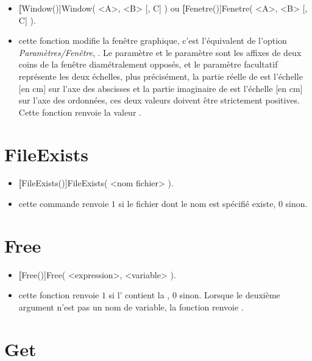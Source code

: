 \begin{itemize}
 \item \util \textbf[Window()]{Window( <A>, <B> [, C] )} ou \textbf[Fenetre()]{Fenetre( <A>, <B> [, C] )}.
 \item \desc cette fonction modifie la fenêtre graphique, c'est l'équivalent de l'option \textit{Paramètres/Fenêtre}, . Le paramètre  et le paramètre  sont les affixes de deux coins de la fenêtre diamétralement opposés, et le paramètre facultatif  représente les deux échelles, plus précisément, la partie réelle de  est l'échelle [en cm] sur l'axe des abscisses et la partie imaginaire de  est l'échelle [en cm] sur l'axe des ordonnées, ces deux valeurs doivent être strictement positives. Cette fonction renvoie la valeur \Nil.
\end{itemize}

\section{FileExists}\label{cmdFileExists}

\begin{itemize}
 \item \textbf[FileExists()]{FileExists( <nom fichier> )}.
 \item \desc cette commande renvoie $1$ si le fichier dont le nom est spécifié existe, $0$ sinon.
\end{itemize}


\section{Free}\label{cmdFree}

\begin{itemize}
 \item \util \textbf[Free()]{Free( <expression>, <variable> )}.
 \item \desc cette fonction renvoie $1$ si l' contient la , $0$ sinon. Lorsque le deuxième argument n'est pas un nom de variable, la fonction renvoie \Nil.
\end{itemize}

\section{Get}\label{cmdGet}

